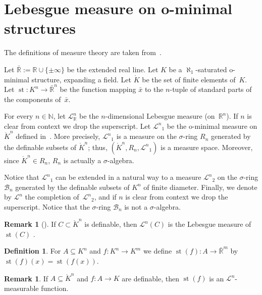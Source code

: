 \documentclass[a4paper, 12pt, final]{article}
\newtheorem{open problem}[lem]{Open problem}
\theoremstyle{remark}
\theoremstyle{definition}
\newtheorem{dfn}[lem]{Definition}
\newtheorem{rem}[lem]{Remark}
\newtheorem{final remark}[lem]{Final remark}
\begin{document}
\section{Lebesgue measure on o-minimal structures}\label{sec:Lebesgue}
The definitions of measure theory are taken from~\cite{halmos}.

Let ${\bar {\mathbb{R}}} := {\mathbb{R}} \cup {\{{\pm \infty}\}}$ be the extended real line.
Let ${K}$ be a $\aleph_1$-saturated o-minimal structure, expanding a field.
Let ${\mathring {K}}$ be the set of finite elements of~${K}$.
Let $\operatorname{st}: {K}^n \to {\bar {\mathbb{R}}}^n$ be the function mapping  ${\bar x}$ to the $n$-tuple of 
standard  parts of the components of~${\bar x}$.

For every $n \in {\mathbb{N}}$, let ${\mathcal L}^n_{\mathbb{R}}$ be the $n$-dimensional Lebesgue
measure (on~${\mathbb{R}}^n$). 
If $n$ is clear from context we drop the  superscript. 
Let ${{\mathcal L}^n}_1$ be the o-minimal measure on ${\mathring {K}}^n$ defined in~\cite{bo}. 
More precisely, ${{\mathcal L}^n}_1$ is a measure on the $\sigma$-ring $R_n$ generated by
the definable subsets of ${\mathring {K}}^n$; thus, $({\mathring {K}}^n, R_n, {{\mathcal L}^n}_1)$ is a measure
space.
Moreover, since ${\mathring {K}}^n \in R_n$, $R_n$ is actually a $\sigma$-algebra.

Notice that ${{\mathcal L}^n}_1$ can be extended in a natural way to a measure
${{\mathcal L}^n}_2$ on the $\sigma$-ring $\mathcal B_n$ 
generated by the definable subsets of ${K}^n$ of finite diameter.  
Finally, we denote by ${{\mathcal L}^n}$ the completion of~${{\mathcal L}^n}_2$, 
and if $n$ is clear from context we drop the superscript.
Notice that the $\sigma$-ring $\mathcal B_n$
is not a $\sigma$-algebra.

\begin{rem}[{\cite[Thm.~4.3]{bo}}]\label{rem:BO}
If $C \subset {\mathring {K}}^n$ is definable,
then ${\mathcal L}^n(C)$ is the Lebesgue measure of $\operatorname{st}(C)$ .
\end{rem}

\begin{dfn}
For $A \subseteq {K}^n$ and  $f: {K}^n \to {K}^m$ we  define
$\operatorname{st}(f): A \to {\bar {\mathbb{R}}}^m$ by $\operatorname{st}(f)(x) = \operatorname{st}(f(x))$.
\end{dfn}

\begin{rem}
If $A\subseteq{\mathring {K}}^n$ and $f : A \to {K}$ are definable,
then $\operatorname{st}(f)$ is an ${\mathcal L}^n${\nobreakdash-\hspace{0pt}\relax} measurable function.
\end{rem}
\end{document}
